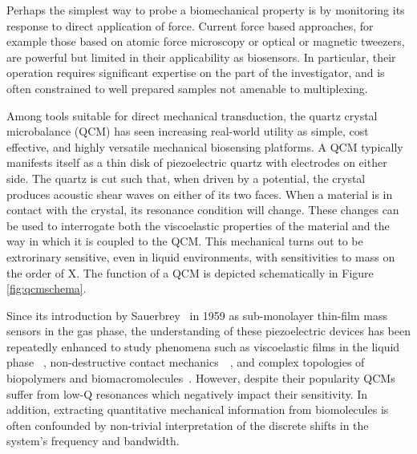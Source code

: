 \documentclass[a4paper,titlepage,onecolumn]{report}
\newcommand{\Figure}[1]{Figure \ref{#1}}
\newcommand{\df}{\Delta\!f}
\newcommand{\dg}{\Delta\Gamma}
\begin{document}
Perhaps the simplest way to probe a biomechanical property is by monitoring
its response to direct application of force. Current force based
approaches, for example those based on atomic force microscopy or optical
or magnetic tweezers, are powerful but limited in their applicability as
biosensors. In particular, their operation requires significant expertise
on the part of the investigator, and is often constrained to well prepared
samples not amenable to multiplexing.

Among tools suitable for direct mechanical transduction, the quartz crystal
microbalance (QCM) has seen increasing real-world utility as simple, cost
effective, and highly versatile mechanical biosensing platforms.  A QCM
typically manifests itself as a thin disk of piezoelectric quartz with
electrodes on either side.  The quartz is cut such that, when driven by a
potential, the crystal produces acoustic shear waves on either of its two
faces.  When a material is in contact with the crystal, its resonance
condition will change.  These changes can be used to interrogate both the
viscoelastic properties of the material and the way in which it is coupled
to the QCM.  This mechanical turns out to be extrorinary sensitive, even in
liquid environments, with sensitivities to mass on the order of X.  The
function of a QCM is depicted schematically in \Figure{fig:qcmschema}.


Since its introduction by Sauerbrey~\cite{sauerbrey1959verwendung} in 1959
as sub-monolayer thin-film mass sensors in the gas phase, the understanding
of these piezoelectric devices has been repeatedly enhanced to study
phenomena such as viscoelastic films in the liquid
phase~\cite{kanazawa1985frequency} , non-destructive contact
mechanics~\cite{borovsky2001measuring}~\cite{johannsman2007contacts}, and
complex topologies of biopolymers and
biomacromolecules~\cite{marx2003quartz}. However, despite their popularity
QCMs suffer from low-Q resonances which negatively impact their
sensitivity. In addition, extracting quantitative mechanical information
from biomolecules is often confounded by non-trivial interpretation of the
discrete shifts in the system's frequency and bandwidth.
\end{document}
